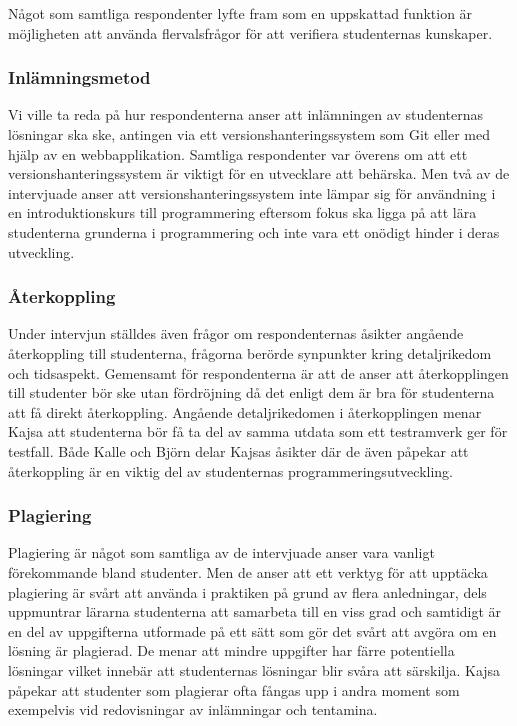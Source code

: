 \documentclass[a4paper,11pt]{article}
\begin{document}
{Något som samtliga respondenter lyfte fram som en uppskattad funktion är möjligheten att använda flervalsfrågor för att verifiera studenternas kunskaper. 

\subsubsection{Inlämningsmetod}

Vi ville ta reda på hur respondenterna anser att inlämningen av studenternas lösningar ska ske, antingen via ett versionshanteringssystem som Git eller med hjälp av en webbapplikation. Samtliga respondenter var överens om att ett versionshanteringssystem är viktigt för en utvecklare att behärska. Men två av de intervjuade anser att versionshanteringssystem inte lämpar sig för användning i en introduktionskurs till programmering eftersom fokus ska ligga på att lära studenterna grunderna i programmering och inte vara ett onödigt hinder i deras utveckling.

\subsubsection{Återkoppling}

Under intervjun ställdes även frågor om respondenternas åsikter angående återkoppling till studenterna, frågorna berörde synpunkter kring detaljrikedom och tidsaspekt. Gemensamt för respondenterna är att de anser att återkopplingen till studenter bör ske utan fördröjning då det enligt dem är bra för studenterna att få direkt återkoppling. Angående detaljrikedomen i återkopplingen menar Kajsa att studenterna bör få ta del av samma utdata som ett testramverk ger för testfall. Både Kalle och Björn delar Kajsas åsikter där de även påpekar att återkoppling är en viktig del av studenternas programmeringsutveckling.

\subsubsection{Plagiering}

Plagiering är något som samtliga av de intervjuade anser vara vanligt förekommande bland studenter. Men de anser att ett verktyg för att upptäcka plagiering är svårt att använda i praktiken på grund av flera anledningar, dels uppmuntrar lärarna studenterna att samarbeta till en viss grad och samtidigt är en del av uppgifterna utformade på ett sätt som gör det svårt att avgöra om en lösning är plagierad. De menar att mindre uppgifter har färre potentiella lösningar vilket innebär att studenternas lösningar blir svåra att särskilja. Kajsa påpekar att studenter som plagierar ofta fångas upp i andra moment som exempelvis vid redovisningar av inlämningar och tentamina. 

}
\end{document}
